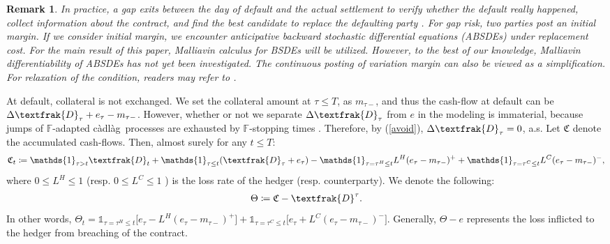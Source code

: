 \documentclass[a4paper, 11pt]{article}              %
\numberwithin{equation}{section}
\theoremstyle{plain}
\newcommand{\cadlag}{c\`adl\`ag}
\newcommand{\1}{\mathds{1}}
\newcommand{\frD}{\textfrak{D}}
\newcommand{\frC}{\mathfrak{C}}
\newcommand{\dsF}{\mathbb{F}}
\theoremstyle{plain}
\theoremstyle{definition}
\newtheorem{remark}[thm]{Remark} %
\theoremstyle{plain}
\newtheorem{remark}{Remark}
\begin{document}
\begin{remark}
  In practice, a gap exits between the day of default and the actual settlement
  to verify whether the default really happened, collect information about the
  contract, and find the best candidate to replace the defaulting party
  \citep{murphy2013otc}. For \textit{gap risk}, two parties post an
  \textit{initial margin}. If we consider \textit{initial margin}, we encounter
  anticipative backward stochastic differential equations (ABSDEs) under
  \textit{replacement cost}.  For the main result of this paper, Malliavin
  calculus for BSDEs will be utilized. However, to the best of our knowledge,
  Malliavin differentiability of ABSDEs has not yet been investigated. The
  continuous posting of \textit{variation margin} can also be viewed as a
  simplification. For relaxation of the condition, readers may refer
  to  . 
\end{remark}       
At default, collateral is not exchanged. We set the collateral amount at
$\tau \leq T$, as $m_{\tau-}$, and thus the cash-flow at default can be
$\Delta\frD_{\tau} + e_{\tau} - m_{\tau-}$.  However, whether or not we separate
$\Delta\frD _{\tau}$ from $e $ in the modeling is immaterial, because jumps of
$\dsF$-adapted \cadlag\ processes are exhausted by $\dsF$-stopping times
\citep[see][Theorem 4.21]{he1992semimartingale}. Therefore, by (\ref{avoid}),
$\Delta \frD _{\tau} =0$, a.s.  Let $\frC $ denote the accumulated cash-flows. Then,
almost surely for any $t \leq T$:
\begin{align}
\frC _t \coloneqq \1_{\tau > t}\frD _t + \1_{\tau \leq t}(\frD _{\tau} + e _{\tau})
  -\1_{\tau =\tau^H\leq t}L^H(e _{\tau} - m _{\tau-})^+
  + \1_{\tau=\tau^C\leq t}L^C(e _{\tau}   - m _{\tau-})^-,\label{def.cf} 
\end{align}
where $0\leq L^H\leq1$ (resp. $0\leq L^C\leq1$ ) is the loss rate of the hedger
(resp. counterparty). We denote the following:
\begin{align}
   \Theta\coloneqq\frC -\frD^\tau. \label{def:J}
\end{align}
In other words,
$\Theta_t = \1_{\tau = \tau^H \leq t}\big[e_\tau - L^H(e _{\tau} - m _{\tau-})^+\big] +\1_{\tau = \tau^C \leq
  t}\big[e_\tau + L^C(e _{\tau} - m _{\tau-})^-\big]$.  Generally, $\Theta-e$ represents the
loss inflicted to the hedger from breaching of the contract.
\end{document}
